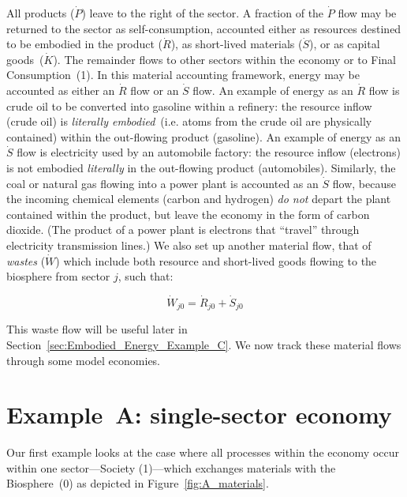 All products ($\dot{P}$) leave to the right of the sector. 
A fraction of the $\dot{P}$ flow may be returned 
to the sector as self-consumption, 
accounted either as resources destined 
to be embodied in the product ($\dot{R}$), 
as short-lived materials ($\dot{S}$), 
or as capital goods~($\dot{K}$).
The remainder flows to other sectors within the economy 
or to Final Consumption~(1). 
In this material accounting framework, 
energy may be accounted as either 
an $\dot{R}$ flow or an $\dot{S}$ flow.
An example of energy as an $\dot{R}$ flow is crude oil 
to be converted into gasoline within a refinery: 
the resource inflow (crude oil) is
\emph{literally embodied}~(i.e. atoms from the crude oil are physically contained)
within the out-flowing product (gasoline).
An example of energy as an $\dot{S}$ flow is electricity
used by an automobile factory: the resource inflow (electrons)
is not embodied \emph{literally} in the out-flowing product (automobiles).
Similarly, the coal or natural gas flowing into a
power plant is accounted as an $\dot{S}$ flow, 
because the incoming chemical elements (carbon and hydrogen) \emph{do
not} depart the plant contained within the product,
but leave the economy in the form of carbon dioxide.  
(The product of a power plant is electrons that ``travel'' through
electricity transmission lines.)
We also set up another material flow,
that of \emph{wastes} ($\dot{W}$) which include both
resource and short-lived goods flowing to the biosphere from sector $j$, 
such that:

\begin{equation}
\dot{W}_{j0} =  \dot{R}_{j0} + \dot{S}_{j0}
\end{equation}

This waste flow will be useful later in Section~\ref{sec:Embodied_Energy_Example_C}.
We now track these material flows through some model economies.

\section{Example~A: single-sector economy} %
\label{sec:A_materials}

Our first example looks at the case where 
all processes within the economy occur within
one sector---Society (1)---which exchanges materials 
with the Biosphere~(0) as depicted in
Figure~\ref{fig:A_materials}.  

